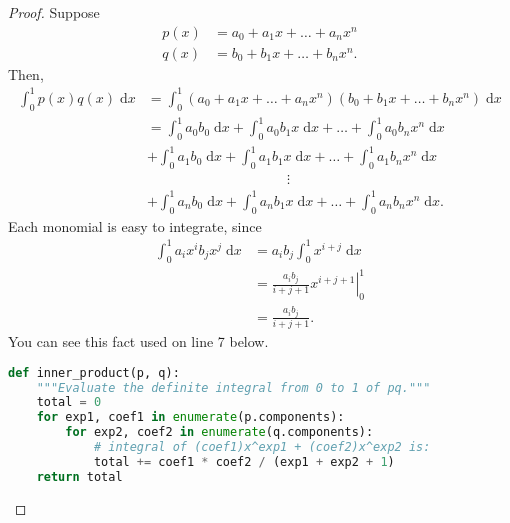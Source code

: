 \documentclass{amsart}
\begin{document}
\begin{proof}
Suppose
\begin{align*}
    p(x) &= a_0+a_1x+\dots+a_nx^n \\
    q(x) &= b_0+b_1x+\dots+b_nx^n.
\end{align*}
Then,
\begin{align*}
    \int_0^1{\!p(x)q(x)\;\mathrm dx} &=
    \int_0^1{\!(a_0+a_1x+\dots+a_nx^n)
    (b_0+b_1x+\dots+b_nx^n)\;\mathrm dx}\\
    &= 
    \int_0^1{\! a_0b_0 \;\mathrm dx}
    +
    \int_0^1{\! a_0b_1x \;\mathrm dx}
    +\dots+
    \int_0^1{\! a_0b_nx^n \;\mathrm dx}
    \\
    &+
    \int_0^1{\! a_1b_0 \;\mathrm dx}
    +
    \int_0^1{\! a_1b_1x \;\mathrm dx}
    +\dots+
    \int_0^1{\! a_1b_nx^n \;\mathrm dx}
    \\
    &\qquad\qquad\qquad\qquad\qquad\vdots\\
    &+
    \int_0^1{\! a_nb_0 \;\mathrm dx}
    +
    \int_0^1{\! a_nb_1x \;\mathrm dx}
    +\dots+
    \int_0^1{\! a_nb_nx^n \;\mathrm dx}.
\end{align*}
Each monomial is easy to integrate, since
\begin{align*}
    \int_0^1{\! a_ix^ib_jx^j \;\mathrm dx}
    &= a_ib_j\int_0^1{\! x^{i+j} \;\mathrm dx} \\
    &= \left.\frac{a_ib_j}{i+j+1}x^{i+j+1}\right|^1_0\\
    &=\frac{a_ib_j}{i+j+1}.
\end{align*}
You can see this fact used on line 7 below.

\lstset{style=mystyle}
\begin{lstlisting}[language=Python]
def inner_product(p, q):
    """Evaluate the definite integral from 0 to 1 of pq."""
    total = 0
    for exp1, coef1 in enumerate(p.components):
        for exp2, coef2 in enumerate(q.components):
            # integral of (coef1)x^exp1 + (coef2)x^exp2 is:
            total += coef1 * coef2 / (exp1 + exp2 + 1)
    return total
\end{lstlisting}
\end{proof}
\end{document}
